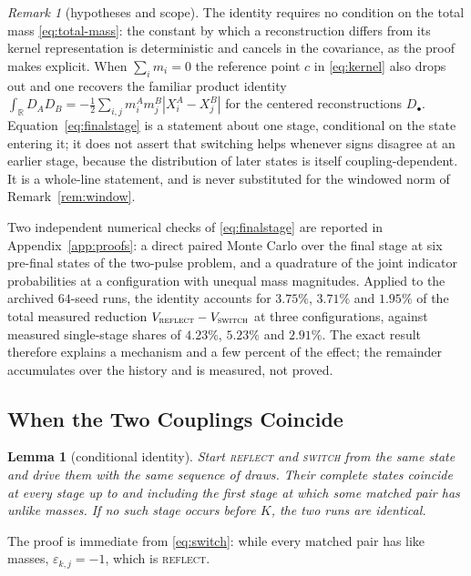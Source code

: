 \documentclass[smallextended,nospthms]{svjour3}
\theoremstyle{plain}
\newtheorem{lemma}[proposition]{Lemma}
\theoremstyle{definition}
\theoremstyle{remark}
\newtheorem{remark}[proposition]{Remark}
\numberwithin{equation}{section}
\newcommand{\R}{\mathbb{R}}
\newcommand{\refl}{\textnormal{\textsc{reflect}}}
\newcommand{\swi}{\textnormal{\textsc{switch}}}
\begin{document}
\begin{remark}[hypotheses and scope]
\label{rem:finalstage-scope}
The identity requires no condition on the total mass \eqref{eq:total-mass}: the
constant by which a reconstruction differs from its kernel representation is
deterministic and cancels in the covariance, as the proof makes explicit. When
$\sum_i m_i=0$ the reference point $c$ in \eqref{eq:kernel} also drops out and
one recovers the familiar product identity
$\int_\R D_AD_B=-\tfrac12\sum_{i,j}m^A_im^B_j|X^A_i-X^B_j|$ for the
centered reconstructions $D_\bullet$. Equation~\eqref{eq:finalstage} is a
statement about one stage, conditional on the state entering it; it does not
assert that switching helps whenever signs disagree at an earlier stage,
because the distribution of later states is itself coupling-dependent. It is a
whole-line statement, and is never substituted for the windowed norm of
Remark~\ref{rem:window}.
\end{remark}

Two independent numerical checks of \eqref{eq:finalstage} are reported in
Appendix~\ref{app:proofs}: a direct paired Monte Carlo over the final stage at
six pre-final states of the two-pulse problem, and a quadrature of the joint
indicator probabilities at a configuration with unequal mass magnitudes.
Applied to the archived $64$-seed runs, the identity accounts for
$3.75\%$, $3.71\%$ and $1.95\%$ of the total measured reduction
$V_{\refl}-V_{\swi}$ at three configurations, against measured single-stage
shares of $4.23\%$, $5.23\%$ and $2.91\%$. The exact result therefore explains
a mechanism and a few percent of the effect; the remainder accumulates over the
history and is measured, not proved.

\subsection{When the Two Couplings Coincide}
\label{sec:equality}

\begin{lemma}[conditional identity]
\label{lem:conditional}
Start \refl{} and \swi{} from the same state and drive them with the same
sequence of draws. Their complete states coincide at every stage up to and
including the first stage at which some matched pair has unlike masses. If no
such stage occurs before $K$, the two runs are identical.
\end{lemma}

The proof is immediate from \eqref{eq:switch}: while every matched pair has
like masses, $\varepsilon_{k,j}=-1$, which is \refl{}.
\end{document}
